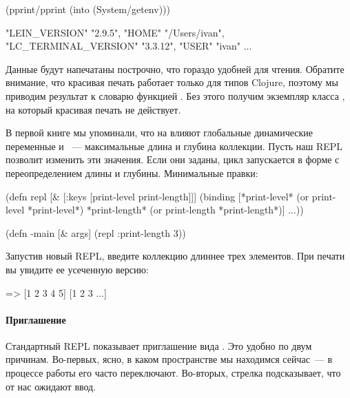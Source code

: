 \begin{english}
  \begin{clojure}
(pprint/pprint
  (into {} (System/getenv)))

{"LEIN_VERSION" "2.9.5",
 "HOME" "/Users/ivan",
 "LC_TERMINAL_VERSION" "3.3.12",
 "USER" "ivan"
 ...
 }
  \end{clojure}
\end{english}

Данные будут напечатаны построчно, что гораздо удобней для чтения. Обратите внимание, что красивая печать работает только для типов Clojure, поэтому мы приводим результат  к словарю функцией . Без этого получим экземпляр класса , на который красивая печать не действует.

В первой книге мы упоминали, что на  влияют глобальные динамические переменные  и ~--- максимальные длина и глубина коллекции. Пусть наш REPL позволит изменить эти значения. Если они заданы, цикл запускается в форме  с переопределением длины и глубины. Минимальные правки:

\begin{english}
  \begin{clojure}
(defn repl [& [{:keys [print-level
                       print-length]}]]
  (binding [*print-level*
            (or print-level *print-level*)
            *print-length*
            (or print-length *print-length*)]
    ...))

(defn -main [& args]
  (repl {:print-length 3}))
  \end{clojure}
\end{english}

Запустив новый REPL, введите коллекцию длиннее трех элементов. При печати вы увидите ее усеченную версию:

\begin{english}
  \begin{clojure}
=> [1 2 3 4 5]
[1 2 3 ...]
  \end{clojure}
\end{english}

\paragraph{Приглашение}

Стандартный REPL показывает приглашение вида . Это удобно по двум причинам. Во-первых, ясно, в каком пространстве мы находимся сейчас~--- в процессе работы его часто переключают. Во-вторых, стрелка подсказывает, что от нас ожидают ввод.

